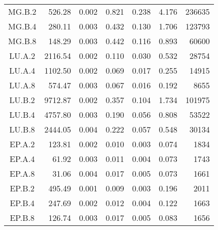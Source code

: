 \begin{longtable}[c]{c*{6}{r}}
MG.B.2 & 526.28 & 0.002 & 0.821 & 0.238 & 4.176 & 236635 \\
MG.B.4 & 280.11 & 0.003 & 0.432 & 0.130 & 1.706 & 123793 \\
MG.B.8 & 148.29 & 0.003 & 0.442 & 0.116 & 0.893 & 60600 \\
LU.A.2 & 2116.54 & 0.002 & 0.110 & 0.030 & 0.532 & 28754 \\
LU.A.4 & 1102.50 & 0.002 & 0.069 & 0.017 & 0.255 & 14915 \\
LU.A.8 & 574.47 & 0.003 & 0.067 & 0.016 & 0.192 & 8655 \\
LU.B.2 & 9712.87 & 0.002 & 0.357 & 0.104 & 1.734 & 101975 \\
LU.B.4 & 4757.80 & 0.003 & 0.190 & 0.056 & 0.808 & 53522 \\
LU.B.8 & 2444.05 & 0.004 & 0.222 & 0.057 & 0.548 & 30134 \\
EP.A.2 & 123.81 & 0.002 & 0.010 & 0.003 & 0.074 & 1834 \\
EP.A.4 & 61.92 & 0.003 & 0.011 & 0.004 & 0.073 & 1743 \\
EP.A.8 & 31.06 & 0.004 & 0.017 & 0.005 & 0.073 & 1661 \\
EP.B.2 & 495.49 & 0.001 & 0.009 & 0.003 & 0.196 & 2011 \\
EP.B.4 & 247.69 & 0.002 & 0.012 & 0.004 & 0.122 & 1663 \\
EP.B.8 & 126.74 & 0.003 & 0.017 & 0.005 & 0.083 & 1656 \\
\bottomrule[1.5pt]
\end{longtable}

